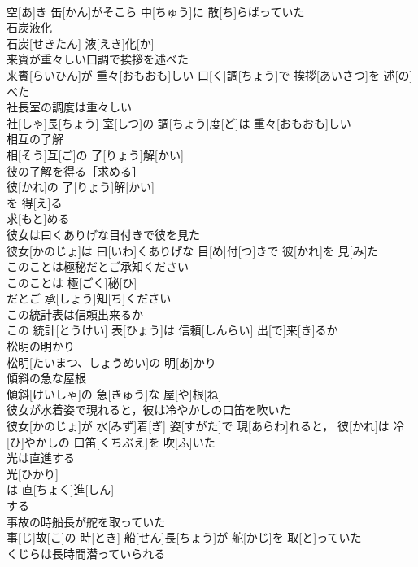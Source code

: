 \documentclass[8pt]{extreport}
\begin{document}
\begin{CJK}{UTF8}{min}
\\	空[あ]き 缶[かん]がそこら 中[ちゅう]に 散[ち]らばっていた
\\	石炭液化	
\\	石炭[せきたん] 液[えき]化[か]
\\	来賓が重々しい口調で挨拶を述べた	
\\	来賓[らいひん]が 重々[おもおも]しい 口[く]調[ちょう]で 挨拶[あいさつ]を 述[の]べた
\\	社長室の調度は重々しい	
\\	社[しゃ]長[ちょう] 室[しつ]の 調[ちょう]度[ど]は 重々[おもおも]しい
\\	相互の了解	
\\	相[そう]互[ご]の 了[りょう]解[かい]
\\	彼の了解を得る［求める］	
\\	彼[かれ]の 了[りょう]解[かい]
\\	を 得[え]る 
\\	求[もと]める 
\\	彼女は曰くありげな目付きで彼を見た	
\\	彼女[かのじょ]は 曰[いわ]くありげな 目[め]付[つ]きで 彼[かれ]を 見[み]た
\\	このことは極秘だとご承知ください	
\\	このことは 極[ごく]秘[ひ]
\\	だとご 承[しょう]知[ち]ください
\\	この統計表は信頼出来るか	
\\	この 統計[とうけい] 表[ひょう]は 信頼[しんらい] 出[で]来[き]るか
\\	松明の明かり	
\\	松明[たいまつ、しょうめい]の 明[あ]かり
\\	傾斜の急な屋根	
\\	傾斜[けいしゃ]の 急[きゅう]な 屋[や]根[ね]
\\	彼女が水着姿で現れると，彼は冷やかしの口笛を吹いた	
\\	彼女[かのじょ]が 水[みず]着[ぎ] 姿[すがた]で 現[あらわ]れると， 彼[かれ]は 冷[ひ]やかしの 口笛[くちぶえ]を 吹[ふ]いた
\\	光は直進する	
\\	光[ひかり]
\\	は 直[ちょく]進[しん]
\\	する 
\\	事故の時船長が舵を取っていた	
\\	事[じ]故[こ]の 時[とき] 船[せん]長[ちょう]が 舵[かじ]を 取[と]っていた
\\	くじらは長時間潜っていられる	

\end{CJK}
\end{document}
